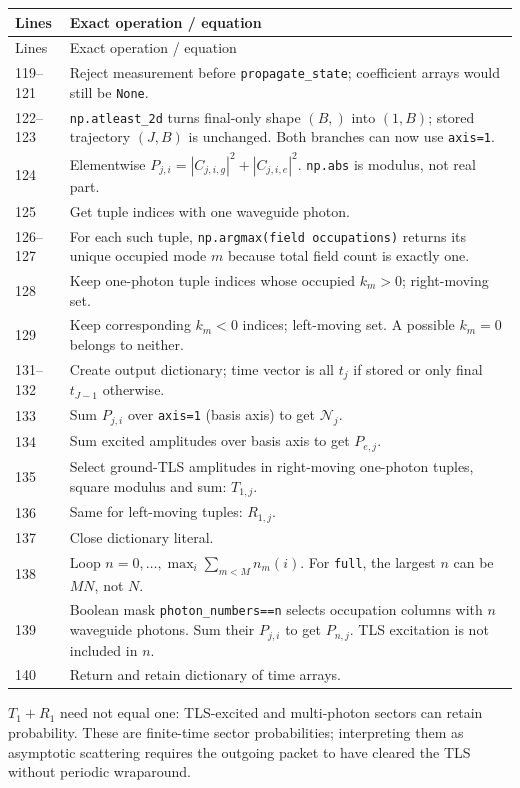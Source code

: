 \documentclass[11pt,a4paper]{article}
\newcommand{\code}[1]{\nolinkurl{#1}}
\begin{document}
\begin{longtable}{p{}p{}}
\toprule Lines & Exact operation / equation\\\midrule\endfirsthead
\toprule Lines & Exact operation / equation\\\midrule\endhead
119--121 & Reject measurement before \code{propagate_state}; coefficient arrays would still be \code{None}.\\
122--123 & \code{np.atleast_2d} turns final-only shape $(B,)$ into $(1,B)$; stored trajectory $(J,B)$ is unchanged. Both branches can now use \code{axis=1}.\\
124 & Elementwise $P_{j,i}=|C_{j,i,g}|^2+|C_{j,i,e}|^2$. \code{np.abs} is modulus, not real part.\\
125 & Get tuple indices with one waveguide photon.\\
126--127 & For each such tuple, \code{np.argmax(field occupations)} returns its unique occupied mode $m$ because total field count is exactly one.\\
128 & Keep one-photon tuple indices whose occupied $k_m>0$; right-moving set.\\
129 & Keep corresponding $k_m<0$ indices; left-moving set. A possible $k_m=0$ belongs to neither.\\
131--132 & Create output dictionary; time vector is all $t_j$ if stored or only final $t_{J-1}$ otherwise.\\
133 & Sum $P_{j,i}$ over \code{axis=1} (basis axis) to get $\mathcal N_j$.\\
134 & Sum excited amplitudes over basis axis to get $P_{e,j}$.\\
135 & Select ground-TLS amplitudes in right-moving one-photon tuples, square modulus and sum: $T_{1,j}$.\\
136 & Same for left-moving tuples: $R_{1,j}$.\\
137 & Close dictionary literal.\\
138 & Loop $n=0,\ldots,\max_i\sum_{m<M}n_m(i)$. For \code{full}, the largest $n$ can be $MN$, not $N$.\\
139 & Boolean mask \code{photon_numbers==n} selects occupation columns with $n$ waveguide photons. Sum their $P_{j,i}$ to get $P_{n,j}$. TLS excitation is not included in $n$.\\
140 & Return and retain dictionary of time arrays.\\
\bottomrule
\end{longtable}
$T_1+R_1$ need not equal one: TLS-excited and multi-photon sectors can retain
probability. These are finite-time sector probabilities; interpreting them as
asymptotic scattering requires the outgoing packet to have cleared the TLS
without periodic wraparound.
\end{document}
